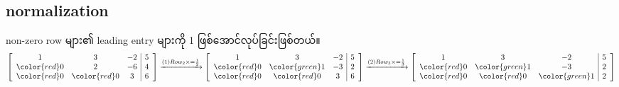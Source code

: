 \subsection{normalization}
non-zero row များ၏ leading entry များကို 1 ဖြစ်အောင်လုပ်ခြင်းဖြစ်တယ်။
\[
        \left[\begin{array}{c c c | c}
            1 & 3 & -2 & 5 \\
            {\color{red}0} & 2 & -6 & 4 \\
            {\color{red}0} & {\color{red}0} & 3 & 6
        \end{array}\right]\xrightarrow{(1)Row_2\times=\frac{1}{2}}\left[\begin{array}{c c c | c}
            1 & 3 & -2 & 5 \\
            {\color{red}0} & {\color{green} 1} & -3 & 2 \\
            {\color{red}0} & {\color{red}0} & 3 & 6
        \end{array}\right]\xrightarrow{(2)Row_3\times=\frac{1}{3}}\left[\begin{array}{c c c | c}
            1 & 3 & -2 & 5 \\
            {\color{red}0} & {\color{green} 1} & -3 & 2 \\
            {\color{red}0} & {\color{red}0} & {\color{green} 1} & 2
        \end{array}\right]
\]
